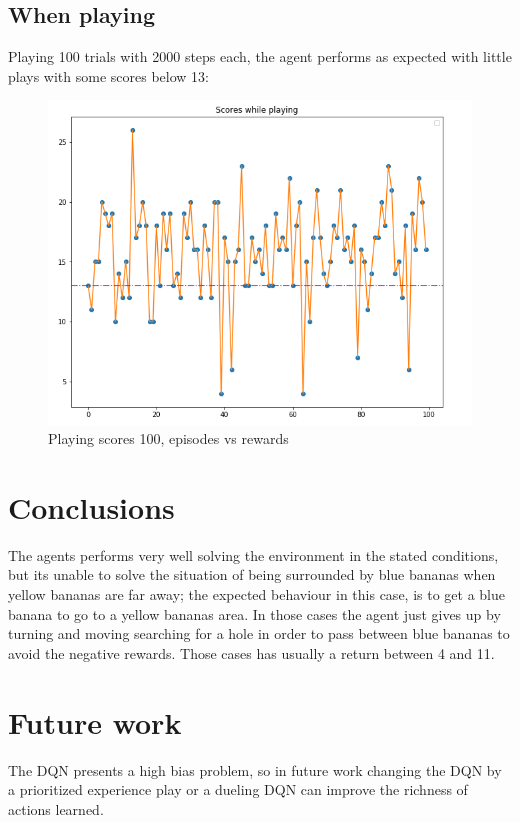 \documentclass{article}
\begin{document}
\subsection{When playing}
Playing 100 trials with 2000 steps each, the agent performs as expected with little plays with some scores below 13:
\begin{figure}[!htbp]
\centering
\includegraphics[scale=0.3]{play_scores}
\caption{Playing scores 100, episodes vs rewards}
\label{fig:play_scores}
\end{figure}

\section{Conclusions}
The agents performs very well solving the environment in the stated conditions, but its unable to solve the situation of being surrounded by blue bananas when yellow bananas are far away; the expected behaviour in this case, is to get a blue banana to go to a yellow bananas area.\newline
In those cases the agent just gives up by turning and moving searching for a hole in order to pass between blue bananas to avoid the negative rewards. Those cases has usually a return between 4 and 11.\newline
\section{Future work}
The DQN presents a high bias problem, so in future work changing the DQN by a prioritized experience play or a dueling DQN can improve the richness of actions learned.

\printbibliography
\end{document}
